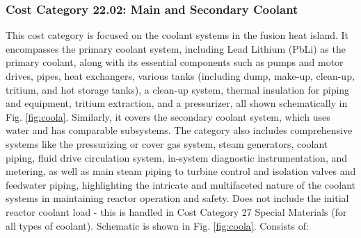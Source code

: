 \subsubsection{Cost Category 22.02: Main and Secondary Coolant} 

This cost category is focused on the coolant systems in the fusion heat island. It encompasses the primary coolant system, including Lead Lithium (PbLi) as the primary coolant, along with its essential components such as pumps and motor drives, pipes, heat exchangers, various tanks (including dump, make-up, clean-up, tritium, and hot storage tanks), a clean-up system, thermal insulation for piping and equipment, tritium extraction, and a pressurizer, all shown schematically in Fig. \ref{fig:coola}. Similarly, it covers the secondary coolant system, which uses water and has comparable subsystems.  The category also includes comprehensive systems like the pressurizing or cover gas system, steam generators, coolant piping, fluid drive circulation system, in-system diagnostic instrumentation, and metering, as well as main steam piping to turbine control and isolation valves and feedwater piping, highlighting the intricate and multifaceted nature of the coolant systems in maintaining reactor operation and safety.  Does not include the initial reactor coolant load - this is handled in  Cost Category 27 Special Materials (for all types of coolant). Schematic is shown in Fig. \ref{fig:coola}. Consists of:

